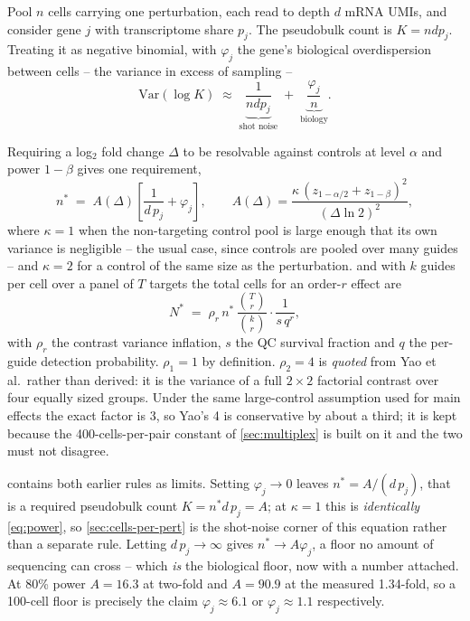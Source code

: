  Pool $n$ cells carrying one perturbation, each read to depth $d$
mRNA UMIs, and consider gene $j$ with transcriptome share $p_j$. The pseudobulk
count is $K=n d p_j$. Treating it as negative binomial, with $\varphi_j$ the
gene's biological overdispersion between cells -- the variance in excess of
sampling -- \begin{equation}
  \mathrm{Var}(\log K)\;\approx\;\underbrace{\frac{1}{n d p_j}}_{\text{shot noise}}
  \;+\;\underbrace{\frac{\varphi_j}{n}}_{\text{biology}} .
  \label{eq:nbvar}
\end{equation}

 Requiring a log$_2$ fold change $\Delta$ to be resolvable against
controls at level $\alpha$ and power $1-\beta$ gives one requirement,
\begin{equation}
  n^{*} \;=\; A(\Delta)\left[\frac{1}{d\,p_j}+\varphi_j\right],
  \qquad
  A(\Delta)=\frac{\kappa\,(z_{1-\alpha/2}+z_{1-\beta})^{2}}{(\Delta\ln 2)^{2}},
  \label{eq:design}
\end{equation}
where $\kappa=1$ when the non-targeting control pool is large enough that its own
variance is negligible -- the usual case, since controls are pooled over many
guides -- and $\kappa=2$ for a control of the same size as the perturbation.
and with $k$ guides per cell over a panel of $T$ targets the total cells for an
order-$r$ effect are
\begin{equation}
  N^{*} \;=\; \rho_r\, n^{*}\,\frac{\binom{T}{r}}{\binom{k}{r}}
  \cdot\frac{1}{s\,q^{r}} ,
  \label{eq:design-total}
\end{equation}
with $\rho_r$ the contrast variance inflation, $s$ the QC survival fraction and
$q$ the per-guide detection probability. $\rho_1{=}1$ by definition. $\rho_2{=}4$
is \emph{quoted} from Yao et al.\ rather than derived: it is the variance of a
full $2\times2$ factorial contrast over four equally sized groups. Under the same
large-control assumption used for main effects the exact factor is 3, so Yao's 4
is conservative by about a third; it is kept because the 400-cells-per-pair
constant of \cref{sec:multiplex} is built on it and the two must not disagree.

  contains both earlier rules as limits.
Setting $\varphi_j\to0$ leaves $n^{*}=A/(d\,p_j)$, that is a required pseudobulk
count $K=n^{*}d\,p_j=A$; at $\kappa=1$ this is \emph{identically}
\cref{eq:power}, so \cref{sec:cells-per-pert} is the shot-noise corner of this
equation rather than a separate rule. Letting $d\,p_j\to\infty$ gives
$n^{*}\to A\varphi_j$, a floor no amount of sequencing can cross -- which
\emph{is} the biological floor, now with a number attached. At
80\% power $A=16.3$ at two-fold and $A=90.9$ at the measured 1.34-fold, so a
100-cell floor is precisely the claim $\varphi_j\approx6.1$ or
$\varphi_j\approx1.1$ respectively.

